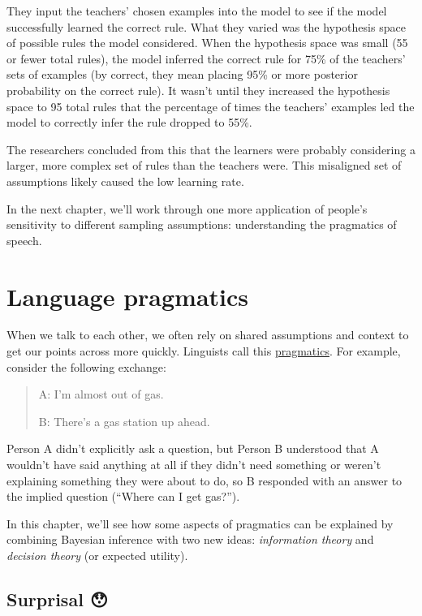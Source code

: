 \documentclass[
  letterpaper,
  DIV=11,
  numbers=noendperiod]{scrreprt}
\begin{document}
They input the teachers' chosen examples into the model to see if the
model successfully learned the correct rule. What they varied was the
hypothesis space of possible rules the model considered. When the
hypothesis space was small (55 or fewer total rules), the model inferred
the correct rule for 75\% of the teachers' sets of examples (by correct,
they mean placing 95\% or more posterior probability on the correct
rule). It wasn't until they increased the hypothesis space to 95 total
rules that the percentage of times the teachers' examples led the model
to correctly infer the rule dropped to 55\%.

The researchers concluded from this that the learners were probably
considering a larger, more complex set of rules than the teachers were.
This misaligned set of assumptions likely caused the low learning rate.

In the next chapter, we'll work through one more application of people's
sensitivity to different sampling assumptions: understanding the
pragmatics of speech.


\chapter{Language pragmatics}\label{pragmatics}

When we talk to each other, we often rely on shared assumptions and
context to get our points across more quickly. Linguists call this
\href{https://en.wikipedia.org/wiki/Pragmatics}{pragmatics}. For
example, consider the following exchange:

\begin{quote}
A: I'm almost out of gas.

B: There's a gas station up ahead.
\end{quote}

Person A didn't explicitly ask a question, but Person B understood that
A wouldn't have said anything at all if they didn't need something or
weren't explaining something they were about to do, so B responded with
an answer to the implied question (``Where can I get gas?'').

In this chapter, we'll see how some aspects of pragmatics can be
explained by combining Bayesian inference with two new ideas:
\emph{information theory} and \emph{decision theory} (or expected
utility).

\section{Surprisal 😯}\label{surprisal}
\end{document}
